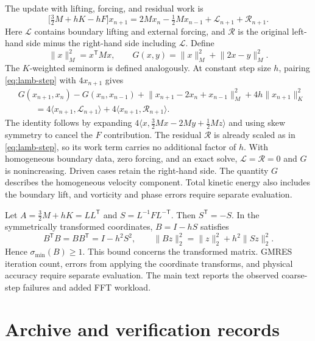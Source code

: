 The update with lifting, forcing, and residual work is
\begin{equation}
 \bigl[\tfrac32 M+hK-hF\bigr]x_{n+1}
 =2Mx_n-\tfrac12 Mx_{n-1}+\mathcal{L}_{n+1}+\mathcal{R}_{n+1}.
 \label{eq:lamb-step}
\end{equation}
Here \(\mathcal{L}\) contains boundary lifting and external forcing, and
\(\mathcal{R}\) is the original left-hand side minus the right-hand side
including \(\mathcal{L}\). Define
\begin{equation}
 \lVert x\rVert_M^2=x^{\mathsf T}Mx,\qquad
 G(x,y)=\lVert x\rVert_M^2+\lVert 2x-y\rVert_M^2.
 \label{eq:lamb-g}
\end{equation}
The \(K\)-weighted seminorm is defined analogously. At constant step
size \(h\), pairing \eqref{eq:lamb-step} with \(4x_{n+1}\) gives
\begin{equation}
 \begin{aligned}
 &G(x_{n+1},x_n)-G(x_n,x_{n-1})
  +\lVert x_{n+1}-2x_n+x_{n-1}\rVert_M^2
  +4h\lVert x_{n+1}\rVert_K^2\\
 &\qquad
  =4\langle x_{n+1},\mathcal{L}_{n+1}\rangle
   +4\langle x_{n+1},\mathcal{R}_{n+1}\rangle .
 \end{aligned}
 \label{eq:lamb-energy}
\end{equation}
The identity follows by expanding
\(4\langle x,\tfrac32 Mx-2My+\tfrac12 Mz\rangle\) and using skew symmetry
to cancel the \(F\) contribution. The residual \(\mathcal{R}\) is already
scaled as in \eqref{eq:lamb-step}, so its work term carries no additional
factor of \(h\). With homogeneous boundary data, zero forcing, and an
exact solve, \(\mathcal{L}=\mathcal{R}=0\) and \(G\) is nonincreasing.
Driven cases retain the right-hand side. The quantity \(G\) describes
the homogeneous velocity component. Total kinetic energy also includes
the boundary lift, and vorticity and phase errors require separate
evaluation.

Let \(A=\tfrac32 M+hK=LL^{\mathsf T}\) and \(S=L^{-1}FL^{-\mathsf T}\).
Then \(S^{\mathsf T}=-S\). In the symmetrically transformed coordinates,
\(B=I-hS\) satisfies
\[
 B^{\mathsf T}B=BB^{\mathsf T}=I-h^2S^2,\qquad
 \lVert Bz\rVert_2^2=\lVert z\rVert_2^2+h^2\lVert Sz\rVert_2^2.
\]
Hence \(\sigma_{\min}(B)\geq1\). This bound concerns the transformed
matrix. GMRES iteration count, errors from applying the coordinate
transforms, and physical accuracy require separate evaluation. The main
text reports the observed coarse-step failures and added FFT workload.

\section{Archive and verification records}
\label{sec:app-evidence}


